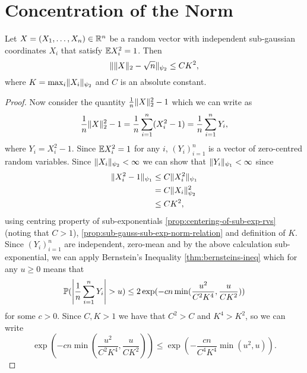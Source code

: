 \documentclass{article}
\begin{document}
\section{Concentration of the Norm}
\begin{theorem}
Let \(X = (X_{1}, \dots, X_{n}) \in \R^{n}\) be a random vector with independent
sub-gaussian coordinates \(X_{i}\) that satisfy \(\E X_{i}^{2} = 1\). Then
\begin{equation}
  \norm{\norm{X}_{2} - \sqrt{n}}_{\psi_{2}} \leq CK^{2},
\end{equation}
where \(K = \max_{i} \norm{X_{i}}_{\psi_{2}}\) and \(C\) is an absolute constant.
\end{theorem}

\begin{proof}

  Now consider the quantity \(\frac{1}{n}\norm{X}_{2}^{2} - 1\) which we can write as
  \begin{equation}
    \frac{1}{n}\norm{X}_{2}^{2} - 1 = \frac{1}{n}\sum_{i=1}^{n}(X_{i}^{2} - 1) = \frac{1}{n}\sum_{i=1}^{n}Y_{i},
  \end{equation}
  where \(Y_{i} = X_{i}^{2} - 1\). Since \(\E X_{i}^{2} = 1\) for any \(i\),
  \((Y_{i})_{i=1}^{n}\) is a vector of zero-centred random variables. Since
  \(\norm{X_{i}}_{\psi_{2}} < \infty\) we can show that
  \(\norm{Y_{i}}_{\psi_{1}} < \infty\) since
  \begin{align}
    \label{al:1}
    \norm{X_i^2 - 1}_{\psi_1} & \leq C\norm{X_i^2}_{\psi_1} \\
                              & = C\norm{X_i}_{\psi_2}^2 \\
                              & \leq C K^2,
  \end{align}
  using centring property of sub-exponentials
  \cref{prop:centering-of-sub-exp-rvs} (noting that \(C > 1\)),
  \cref{prop:sub-gauss-sub-exp-norm-relation} and definition of \(K\). Since
  \((Y_{i})_{i=1}^{n}\) are independent, zero-mean and by the above calculation sub-exponential, we can apply Bernstein's Inequality
  \cref{thm:bernsteins-ineq} which for any \(u \geq 0\) means that
  \begin{equation}
    \Pr(\abs*{\frac{1}{n}\sum_{i=1}^{n}Y_{i}} > u) \leq 2 \exp(-cn\min(\frac{u^{2}}{C^{2}K^{4}}, \frac{u}{CK^{2}}))
  \end{equation}
  for some \(c > 0\). Since \(C, K > 1\) we have that \(C^{2} > C\) and
  \(K^{4} > K^{2}\), so we can write
  \begin{equation}
    \label{eq:conc-norm-bernstein}
    \exp(-cn\min(\frac{u^{2}}{C^{2}K^{4}}, \frac{u}{CK^{2}})) \leq \exp(-\frac{cn}{C^{4}K^{4}}\min(u^{2}, u)).
  \end{equation}


\end{proof}
\end{document}
